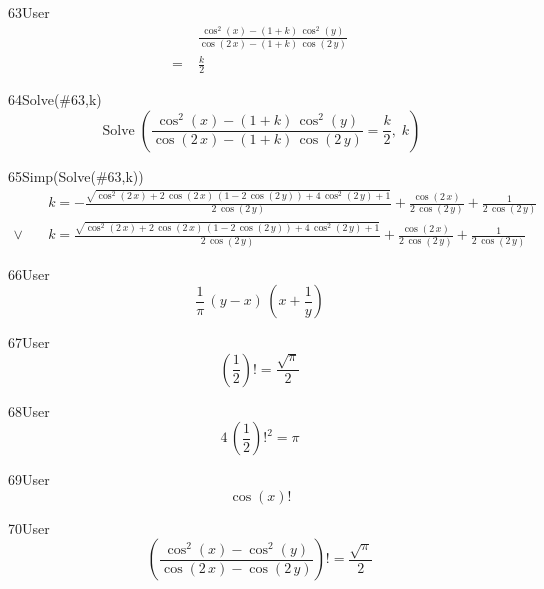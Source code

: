\begin{espr}{63}{User}{}
\begin{align*}
& \frac{\cos^{2}\!\left(x\right) - \left(1 + k\right)\, \cos^{2}\!\left(y\right)}{\cos\!\left(2\, x\right) - \left(1 + k\right)\, \cos\!\left(2\, y\right)} \\
=\;& \frac{k}{2}
\end{align*}
\end{espr}
\begin{espr}{64}{Solve(\#63,k)}{}
\[
\operatorname{Solve}\!\left(\frac{\cos^{2}\!\left(x\right) - \left(1 + k\right)\, \cos^{2}\!\left(y\right)}{\cos\!\left(2\, x\right) - \left(1 + k\right)\, \cos\!\left(2\, y\right)} = \frac{k}{2},\; k\right)
\]
\end{espr}
\begin{espr}{65}{Simp(Solve(\#63,k))}{}
\begin{align*}
& k = -\frac{\sqrt{\cos^{2}\!\left(2\, x\right) + 2\, \cos\!\left(2\, x\right)\, \left(1 - 2\, \cos\!\left(2\, y\right)\right) + 4\, \cos^{2}\!\left(2\, y\right) + 1}}{2\, \cos\!\left(2\, y\right)} + \frac{\cos\!\left(2\, x\right)}{2\, \cos\!\left(2\, y\right)} + \frac{1}{2\, \cos\!\left(2\, y\right)} \\[3pt]
\lor\quad & k = \frac{\sqrt{\cos^{2}\!\left(2\, x\right) + 2\, \cos\!\left(2\, x\right)\, \left(1 - 2\, \cos\!\left(2\, y\right)\right) + 4\, \cos^{2}\!\left(2\, y\right) + 1}}{2\, \cos\!\left(2\, y\right)} + \frac{\cos\!\left(2\, x\right)}{2\, \cos\!\left(2\, y\right)} + \frac{1}{2\, \cos\!\left(2\, y\right)}
\end{align*}
\end{espr}
\begin{espr}{66}{User}{}
\[
\frac{1}{\pi}\, \left(y - x\right)\, \left(x + \frac{1}{y}\right)
\]
\end{espr}
\begin{espr}{67}{User}{\verificata}
\[
\left(\frac{1}{2}\right)! = \frac{\sqrt{\pi}}{2}
\]
\end{espr}
\begin{espr}{68}{User}{\verificata}
\[
4\, \left(\frac{1}{2}\right)!^{2} = \pi
\]
\end{espr}
\begin{espr}{69}{User}{}
\[
\cos\!\left(x\right)!
\]
\end{espr}
\begin{espr}{70}{User}{\verificata}
\[
\left(\frac{\cos^{2}\!\left(x\right) - \cos^{2}\!\left(y\right)}{\cos\!\left(2\, x\right) - \cos\!\left(2\, y\right)}\right)! = \frac{\sqrt{\pi}}{2}
\]
\end{espr}
